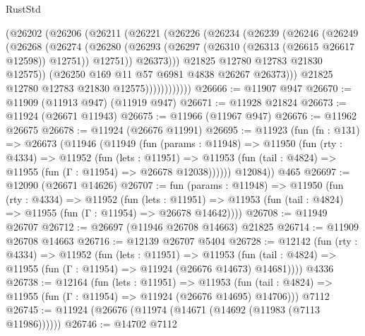 \begin{lexlean}{RustStd}
\begin{coremodule}
{\begin{coremodule}
{{{{{{{{{{{{{{{{{{{{{{{{{{{{{{{{{{{{{{{{{{{{{{{{{{{{{{{{{{{{{{{{{{{{{{{{{{{{{{{{                    (@26202
                      (@26206
                        (@26211
                          (@26221
                            (@26226
                              (@26234
                                (@26239
                                  (@26246
                                    (@26249
                                      (@26268
                                        (@26274
                                          (@26280
                                            (@26293
                                              (@26297
                                                (@26310 (@26313 (@26615 @26617 @12598)) @12751))
                                              @12751))
                                          @26373)))
                                    @21825
                                    @12780
                                    @12783
                                    @21830
                                    @12575))
                                (@26250 @169 @11 @57 @6981 @4838 @26267 @26373)))
                            @21825
                            @12780
                            @12783
                            @21830
                            @12575))))))))))))
@26666 := @11907 @947
@26670 := @11909 (@11913 @947) (@11919 @947)
@26671 := @11928 @21824
@26673 := @11924 (@26671 @11943)
@26675 := @11966 (@11967 @947)
@26676 := @11962 @26675
@26678 := @11924 (@26676 @11991)
@26695 := @11923
    (fun (fn : @131) =>
    @26673
      (@11946
        (@11949
          (fun (params : @11948) =>
          @11950
            (fun (rty : @4334) =>
            @11952
              (fun (lets : @11951) =>
              @11953 (fun (tail : @4824) => @11955 (fun (Γ : @11954) => @26678 @12038))))))
        @12084))
    @465
@26697 := @12090 (@26671 @14626)
@26707 := fun (params : @11948) =>
  @11950
    (fun (rty : @4334) =>
    @11952
      (fun (lets : @11951) =>
      @11953 (fun (tail : @4824) => @11955 (fun (Γ : @11954) => @26678 @14642))))
@26708 := @11949 @26707
@26712 := @26697 (@11946 @26708 @14663) @21825
@26714 := @11909 @26708 @14663
@26716 := @12139 @26707 @5404
@26728 := @12142
    (fun (rty : @4334) =>
    @11952
      (fun (lets : @11951) =>
      @11953 (fun (tail : @4824) => @11955 (fun (Γ : @11954) => @11924 (@26676 @14673) @14681))))
    @4336
@26738 := @12164
    (fun (lets : @11951) =>
    @11953 (fun (tail : @4824) => @11955 (fun (Γ : @11954) => @11924 (@26676 @14695) @14706)))
    @7112
@26745 := @11924 (@26676 (@11974 (@14671 (@14692 (@11983 (@7113 @11986))))))
@26746 := @14702 @7112
}}}}}}}}}}}}}}}}}}}}}}}}}}}}}}}}}}}}}}}}}}}}}}}}}}}}}}}}}}}}}}}}}}}}}}}}}}}}}}}}
\end{coremodule}}
\end{coremodule}
\end{lexlean}
